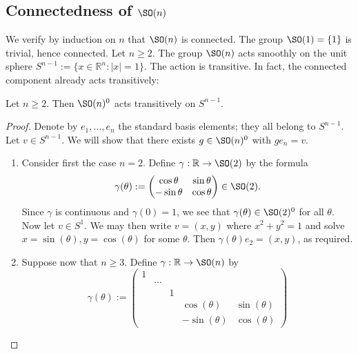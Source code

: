 \documentclass[reqno]{amsart} 
\begin{document}
\subsection{Connectedness of \texorpdfstring{$\SO(n)$}{SO(n)}}
\label{sec:orga8ac11a}
We verify by induction on $n$ that $\SO(n)$
is connected.
The group $\SO(1) = \{1\}$ is trivial,
hence connected.
Let $n \geq 2$.
The group $\SO(n)$ acts smoothly on the unit sphere $S^{n-1} := \{x
\in \mathbb{R}^n : |x| = 1\}$.
The action is transitive.
In fact, the connected component already acts transitively:
\begin{lemma}\label{lem:so-n-connected-component-acts-transitively-on-sphere}
  Let $n \geq 2$.
  Then $\SO(n)^0$ acts transitively on $S^{n-1}$.
\end{lemma}
\begin{proof}
  Denote by $e_1,\dotsc,e_n$
  the standard basis elements; they all belong to $S^{n-1}$.
  Let $v \in S^{n-1}$.
  We will show that there exists $g \in \SO(n)^0$
  with $g e_n = v$.
  \begin{enumerate}
  \item Consider first the case $n = 2$.
    Define $\gamma : \mathbb{R} \rightarrow \SO(2)$
    by the formula
    \begin{equation*}
    \gamma(\theta) := 
\begin{pmatrix}
      \cos \theta  & \sin \theta  \\
      -\sin \theta  & \cos \theta 
    \end{pmatrix}
 \in \SO(2).
    \end{equation*}
    Since $\gamma$ is continuous and $\gamma(0) = 1$,
    we see that $\gamma(\theta) \in \SO(2)^0$ for all $\theta$.
    Now let $v \in S^{1}$.
    We may then write $v = (x,y)$ where $x^2 + y^2 = 1$
    and solve $x = \sin(\theta), y = \cos(\theta)$ for some
    $\theta$.
    Then
    $\gamma(\theta) e_2 = (x,y)$,
    as required.
  \item Suppose now that $n \geq 3$.
    Define $\gamma : \mathbb{R} \rightarrow \SO(n)$
    by
    \begin{equation*}
    \gamma(\theta)
    :=
    \begin{pmatrix}
      1 &  & & & \\
      & \dotsb & & & \\
      &  & 1 & & \\
      & & & \cos(\theta) & \sin(\theta) \\
      & & & -\sin(\theta) & \cos(\theta)
    \end{pmatrix}

\end{equation*}
\end{enumerate}
\end{proof}
\end{document}
